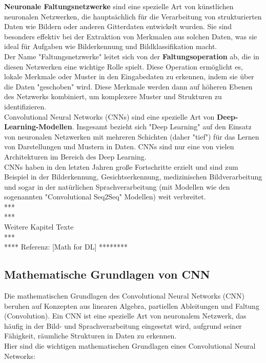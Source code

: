 \documentclass[12pt]{article}
\begin{document}
\textbf{Neuronale Faltungsnetzwerke} sind eine spezielle Art von künstlichen neuronalen Netzwerken, die hauptsächlich für die Verarbeitung von strukturierten Daten wie Bildern oder anderen Gitterdaten entwickelt wurden. Sie sind besonders effektiv bei der Extraktion von Merkmalen aus solchen Daten, was sie ideal für Aufgaben wie Bilderkennung und Bildklassifikation macht.
\\
Der Name "Faltungsnetzwerke" leitet sich von der \textbf{Faltungsoperation} ab, die in diesen Netzwerken eine wichtige Rolle spielt. Diese Operation ermöglicht es, lokale Merkmale oder Muster in den Eingabedaten zu erkennen, indem sie über die Daten "geschoben" wird. Diese Merkmale werden dann auf höheren Ebenen des Netzwerks kombiniert, um komplexere Muster und Strukturen zu identifizieren.
\\Convolutional Neural Networks (CNNs) sind eine spezielle Art von \textbf {Deep-Learning-Modellen}. Insgesamt bezieht sich "Deep Learning" auf den Einsatz von neuronalen Netzwerken mit mehreren Schichten (daher "tief") für das Lernen von Darstellungen und Mustern in Daten. CNNs sind nur eine von vielen Architekturen im Bereich des Deep Learning.\\
CNNs haben in den letzten Jahren große Fortschritte erzielt und sind zum Beispiel in der Bilderkennung, Gesichtserkennung, medizinischen Bildverarbeitung und sogar in der natürlichen Sprachverarbeitung (mit Modellen wie den sogenannten "Convolutional Seq2Seq" Modellen) weit verbreitet.\\
***\\
***\\ Weitere Kapitel Texte \\
***\\
**** Referenz: [Math for DL] ******** 
\subsection{Mathematische Grundlagen von CNN}
Die mathematischen Grundlagen des Convolutional Neural Networks (CNN) beruhen auf Konzepten aus linearen Algebra, partiellen Ableitungen und Faltung (Convolution). Ein CNN ist eine spezielle Art von neuronalem Netzwerk, das häufig in der Bild- und Sprachverarbeitung eingesetzt wird, aufgrund seiner Fähigkeit, räumliche Strukturen in Daten zu erkennen.\\
Hier sind die wichtigen mathematischen Grundlagen eines Convolutional Neural Networks:\\
\end{document}
